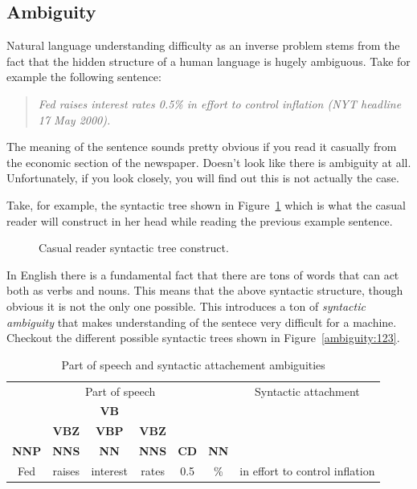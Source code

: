 \documentclass[a4paper,10pt]{report}
\begin{document}
\subsection*{Ambiguity}
Natural language understanding difficulty as an inverse problem stems from the fact that the hidden structure of a human language is hugely ambiguous. Take for example the following sentence:
\begin{quote}
 \textit{Fed raises interest rates 0.5\% in effort to control inflation (NYT headline 17 May 2000).}
\end{quote}
The meaning of the sentence sounds pretty obvious if you read it casually from the economic section of the newspaper. Doesn't look like there is ambiguity at all. Unfortunately, if you look closely, you will find out this is not actually the case.

Take, for example, the syntactic tree shown in Figure~\ref{ambiguity:0} which is what the casual reader will construct in her head while reading the previous example sentence.

\begin{figure}[ht]
\centering
{}
\caption{Casual reader syntactic tree construct.}
\label{ambiguity:0}
\end{figure}

In English there is a fundamental fact that there are tons of words that can act both as verbs and nouns. This means that the above syntactic structure, though obvious it is not the only one possible. This introduces a ton of \emph{syntactic ambiguity} that makes understanding of the sentece very difficult for a machine. Checkout the different possible syntactic trees shown in Figure~\ref{ambiguity:123}.

\begin{center}
\begin{table}
\begin{tabular}{ c c c c c c c }
  \multicolumn{6}{c}{Part of speech} & Syntactic attachment\\
  & & \textbf{VB} & & & & \\
  & \textbf{VBZ} & \textbf{VBP} & \textbf{VBZ} & & & \\
  \textbf{NNP} & \textbf{NNS} & \textbf{NN} & \textbf{NNS} & \textbf{CD} & \textbf{NN} & \\
  Fed & raises & interest & rates & 0.5 & \% & in effort to control inflation \\
\end{tabular}
\caption{Part of speech and syntactic attachement ambiguities}
\end{table}
\end{center}
\end{document}
